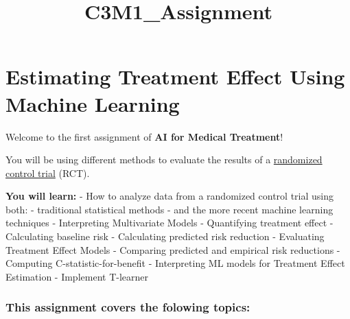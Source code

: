 \documentclass[11pt]{article}
\title{C3M1\_Assignment}
\begin{document}
    
    
    \maketitle
    
    

    
    \hypertarget{estimating-treatment-effect-using-machine-learning}{%
\section{Estimating Treatment Effect Using Machine
Learning}\label{estimating-treatment-effect-using-machine-learning}}

    Welcome to the first assignment of \textbf{AI for Medical Treatment}!

You will be using different methods to evaluate the results of a
\href{https://en.wikipedia.org/wiki/Randomized_controlled_trial}{randomized
control trial} (RCT).

\textbf{You will learn:} - How to analyze data from a randomized control
trial using both: - traditional statistical methods - and the more
recent machine learning techniques - Interpreting Multivariate Models -
Quantifying treatment effect - Calculating baseline risk - Calculating
predicted risk reduction - Evaluating Treatment Effect Models -
Comparing predicted and empirical risk reductions - Computing
C-statistic-for-benefit - Interpreting ML models for Treatment Effect
Estimation - Implement T-learner

    \hypertarget{this-assignment-covers-the-folowing-topics}{%
\subsubsection{This assignment covers the folowing
topics:}\label{this-assignment-covers-the-folowing-topics}}
\end{document}
